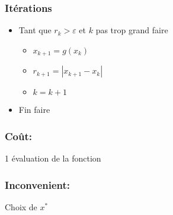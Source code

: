 \subsubsection*{Itérations}
\begin{itemize}
    \item Tant que $r_k > \varepsilon$ et  $k$ pas trop grand faire
         \begin{itemize}
            \item $x_{k+1} = g(x_k)$
            \item $r_{k+1} = |x_{k+1} - x_k|$
            \item $k = k + 1$
        \end{itemize}
    \item Fin faire
\end{itemize}
\subsubsection*{Coût:}
1 évaluation de la fonction

\subsubsection*{Inconvenient:}
Choix de $x^*$

